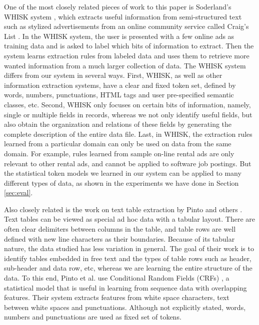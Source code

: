 One of the most closely related pieces of work to this paper is Soderland's WHISK
system \cite{soderland:whisk}, which extracts useful information from
semi-structured text such as stylized advertisements from an online community
service called Craig's List \cite{craigslist}.
In the WHISK system, the user is presented with a few online ads as training data 
and is asked to label which bits of information to extract. Then the system learns
extraction rules from labeled data and uses them to retrieve more wanted
information from a much larger collection of data. 
The WHISK system differs from our system in several ways. 
First, WHISK, as well as other information extraction systems,
have a clear and fixed token set, defined by words, numbers, punctuations, 
HTML tags and user pre-specified semantic classes, etc. 
Second, WHISK only focuses on certain bits of
information, namely, single or multiple fields in records, 
whereas we not only identify useful fields, but also obtain the 
organization and relations of these fields by generating the complete 
description of the entire data file. 
Last, in WHISK, the extraction rules learned from a particular domain can only
be used on data from the same domain. For example, rules learned from
sample on-line rental
ads are only relevant to other rental ads, and cannot be applied to
software job postings. But the statistical token models we learned in our system can be
applied to many different types of data, as shown in the experiments we
have done in Section \ref{sec:eval}.  


Also closely related is the work on text table extraction by
Pinto and others \cite{Pinto+:texttables}. Text tables can
be viewed as special ad hoc data with a tabular layout. There are
often clear delimiters between columns in the table, and table rows
are well defined with new line characters as their boundaries.
Because of its tabular nature, the data studied has less variation in general. 
The goal of their work  
is to identify tables embedded in free text and the types of table rows 
such as header, sub-header and data row, etc, whereas we are learning the entire
structure of the data. 
To this end, Pinto et al. use Conditional Random Fields (CRFs) 
\cite{LaffertyMP01:CRF},
a statistical model that is useful in learning from sequence data with 
overlapping features.
Their system extracts features from white space characters,
text between white spaces and punctuations. Although not explicitly
stated, words, numbers and punctuations are used as fixed set of tokens. 
 
